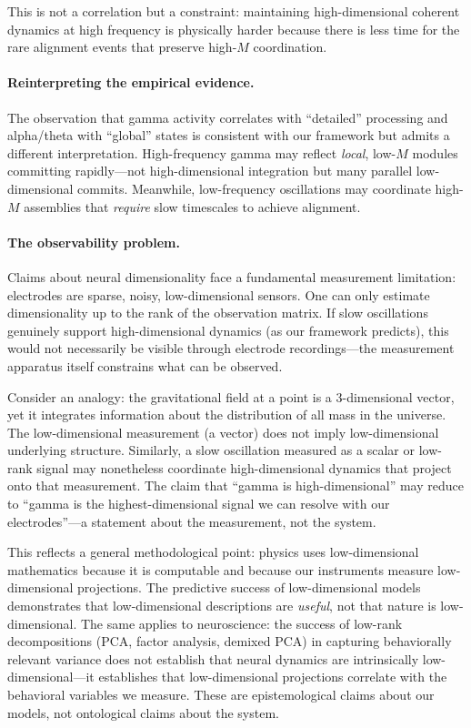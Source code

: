 \documentclass[12pt]{article}
\begin{document}
This is not a correlation but a constraint: maintaining high-dimensional coherent dynamics at high frequency is physically harder because there is less time for the rare alignment events that preserve high-$M$ coordination.

\paragraph{Reinterpreting the empirical evidence.} The observation that gamma activity correlates with ``detailed'' processing and alpha/theta with ``global'' states is consistent with our framework but admits a different interpretation. High-frequency gamma may reflect \emph{local}, low-$M$ modules committing rapidly---not high-dimensional integration but many parallel low-dimensional commits. Meanwhile, low-frequency oscillations may coordinate high-$M$ assemblies that \emph{require} slow timescales to achieve alignment.

\paragraph{The observability problem.} Claims about neural dimensionality face a fundamental measurement limitation: electrodes are sparse, noisy, low-dimensional sensors. One can only estimate dimensionality up to the rank of the observation matrix. If slow oscillations genuinely support high-dimensional dynamics (as our framework predicts), this would not necessarily be visible through electrode recordings---the measurement apparatus itself constrains what can be observed.

Consider an analogy: the gravitational field at a point is a 3-dimensional vector, yet it integrates information about the distribution of all mass in the universe. The low-dimensional measurement (a vector) does not imply low-dimensional underlying structure. Similarly, a slow oscillation measured as a scalar or low-rank signal may nonetheless coordinate high-dimensional dynamics that project onto that measurement. The claim that ``gamma is high-dimensional'' may reduce to ``gamma is the highest-dimensional signal we can resolve with our electrodes''---a statement about the measurement, not the system.

This reflects a general methodological point: physics uses low-dimensional mathematics because it is computable and because our instruments measure low-dimensional projections. The predictive success of low-dimensional models demonstrates that low-dimensional descriptions are \emph{useful}, not that nature is low-dimensional. The same applies to neuroscience: the success of low-rank decompositions (PCA, factor analysis, demixed PCA) in capturing behaviorally relevant variance does not establish that neural dynamics are intrinsically low-dimensional---it establishes that low-dimensional projections correlate with the behavioral variables we measure. These are epistemological claims about our models, not ontological claims about the system.
\end{document}
